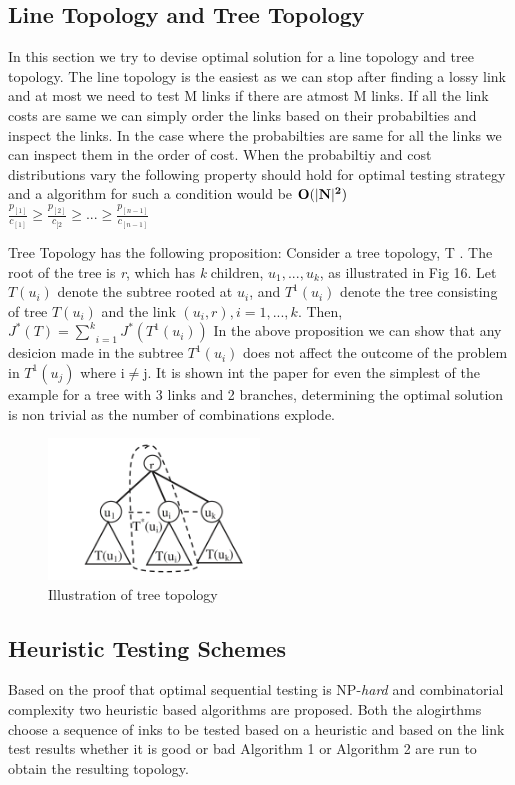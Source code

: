 \documentclass[10pt]{sigplan-proc-varsize}
\begin{document}
\subsection{Line Topology and Tree Topology}
In this section we try to devise optimal solution for a line topology and tree topology. The line topology is the easiest as we can stop after finding a lossy link and at most we need to test M links if there are atmost M links. If all the link costs are same we can simply order the links  based on their probabilties and inspect the links. In the case where the probabilties are same for all the links we can inspect them in the order of cost. When the probabiltiy and cost distributions vary the following property should hold for optimal testing strategy and a algorithm for such a condition would be ${\bf O(|N|^2)}$\\
$\frac{p_{[1]}}{c_{[1]}} \geq \frac{p_{[2]}}{c_{[2}} \geq ... \geq \frac{p_{[n-1]}}{c_{[n-1]}}$

Tree Topology has the following proposition: Consider a tree topology, T . The root of the tree is {\it r}, which has {\it k} children, $u_1, . . . ,u_k$, as illustrated in Fig 16. Let $T(u_i)$ denote the subtree rooted at $u_i$, and $T^1(u_i)$ denote the tree consisting of tree $T(u_i)$ and the link $(u_i,r), i=1,...,k$. Then, \\
$J^*(T)=\underset{i=1}{\overset{k}{\sum}}J^*(T^1(u_i))$
In the above proposition we can show that any desicion made in the subtree $T^1(u_i)$ does not affect the outcome of the problem in $T^1(u_j)$ where i$\neq$j. It is shown int the paper for even the simplest of the example for a tree with 3 links and 2 branches, determining the optimal solution is non trivial as the number of combinations explode. 

\begin{figure}[h!]
  \caption{Illustration of tree topology}
  \centering
    \includegraphics[width=0.5\textwidth]{Fig18}
\end{figure}

\subsection{Heuristic Testing Schemes}
Based on the proof that optimal sequential testing is NP-{\it hard} and combinatorial complexity two heuristic based algorithms are proposed. Both the alogirthms choose a sequence of inks to be tested based on a heuristic and based on the link test results whether it is good or bad Algorithm 1 or Algorithm 2 are run to obtain the resulting topology. 
\end{document}

